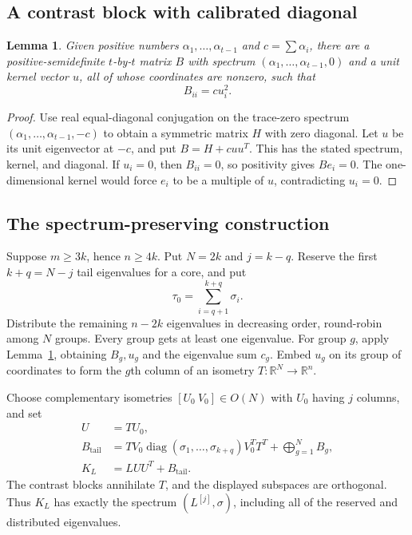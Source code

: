 \documentclass[11pt]{article}
\newtheorem{lemma}[theorem]{Lemma}
\theoremstyle{remark}\newtheorem{remark}[theorem]{Remark}
\newcommand{\R}{\mathbb R}
\newcommand{\diag}{\operatorname{diag}}
\begin{document}
\subsection{A contrast block with calibrated diagonal}
\begin{lemma}\label{le:contrast}
Given positive numbers $\alpha_1,\ldots,\alpha_{t-1}$ and $c=\sum\alpha_i$, there are a positive-semidefinite $t$-by-$t$ matrix $B$ with spectrum $(\alpha_1,\ldots,\alpha_{t-1},0)$ and a unit kernel vector $u$, all of whose coordinates are nonzero, such that
\begin{equation}\label{eq:calibrated}
 B_{ii}=c u_i^2.
\end{equation}
\end{lemma}
\begin{proof}
Use real equal-diagonal conjugation on the trace-zero spectrum $(\alpha_1,\ldots,\alpha_{t-1},-c)$ to obtain a symmetric matrix $H$ with zero diagonal. Let $u$ be its unit eigenvector at $-c$, and put $B=H+c uu^T$. This has the stated spectrum, kernel, and diagonal. If $u_i=0$, then $B_{ii}=0$, so positivity gives $Be_i=0$. The one-dimensional kernel would force $e_i$ to be a multiple of $u$, contradicting $u_i=0$.
\end{proof}

\subsection{The spectrum-preserving construction}
Suppose $m\ge3k$, hence $n\ge4k$. Put $N=2k$ and $j=k-q$. Reserve the first $k+q=N-j$ tail eigenvalues for a core, and put
\[
 \tau_0=\sum_{i=q+1}^{k+q}\sigma_i.
\]
Distribute the remaining $n-2k$ eigenvalues in decreasing order, round-robin among $N$ groups. Every group gets at least one eigenvalue. For group $g$, apply Lemma~\ref{le:contrast}, obtaining $B_g,u_g$ and the eigenvalue sum $c_g$. Embed $u_g$ on its group of coordinates to form the $g$th column of an isometry $T:\R^N\to\R^n$.

Choose complementary isometries $[U_0\ V_0]\in O(N)$ with $U_0$ having $j$ columns, and set
\begin{align}
 U&=T U_0,\nonumber\\
 B_{\mathrm{tail}}
 &=T V_0\diag(\sigma_1,\ldots,\sigma_{k+q})V_0^TT^T
   +\bigoplus_{g=1}^N B_g,\label{eq:groupcov}\\
 K_L&=L UU^T+B_{\mathrm{tail}}.\nonumber
\end{align}
The contrast blocks annihilate $T$, and the displayed subspaces are orthogonal. Thus $K_L$ has exactly the spectrum $(L^{[j]},\sigma)$, including all of the reserved and distributed eigenvalues.
\end{document}
